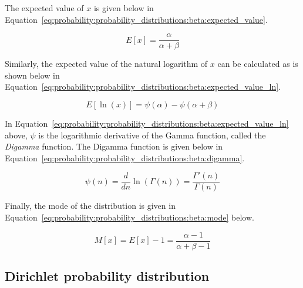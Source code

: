 \noindent
The expected value of $x$ is given below in Equation~\eqref{eq:probability:probability_distributions:beta:expected_value}.

\begin{equation}
      \label{eq:probability:probability_distributions:beta:expected_value}
      E[x] = \frac{\alpha}{\alpha + \beta}
\end{equation}

\noindent
Similarly, the expected value of the natural logarithm of $x$ can be calculated as is shown below in Equation~\eqref{eq:probability:probability_distributions:beta:expected_value_ln}.

\begin{equation}
      \label{eq:probability:probability_distributions:beta:expected_value_ln}
      E[\ln(x)] = \psi({\alpha}) - \psi(\alpha + \beta)
\end{equation}

\noindent
In Equation~\eqref{eq:probability:probability_distributions:beta:expected_value_ln} above, $\psi$ is the logarithmic derivative of the Gamma function, called the \textit{Digamma} function. The Digamma function is given below in Equation~\eqref{eq:probability:probability_distributions:beta:digamma}.

\begin{equation}
      \label{eq:probability:probability_distributions:beta:digamma}
      \psi(n) = \frac{d}{dn}\ln(\Gamma(n)) = \frac{\Gamma'(n)}{\Gamma(n)}
\end{equation}

\noindent
Finally, the mode of the distribution is given in Equation~\eqref{eq:probability:probability_distributions:beta:mode} below.

\begin{equation}
      \label{eq:probability:probability_distributions:beta:mode}
      M[x] = E[x] - 1 = \frac{\alpha - 1}{\alpha + \beta - 1}
\end{equation}


\subsection{Dirichlet probability distribution}\label{sec:probability:probability_distributions:dirichlet}

